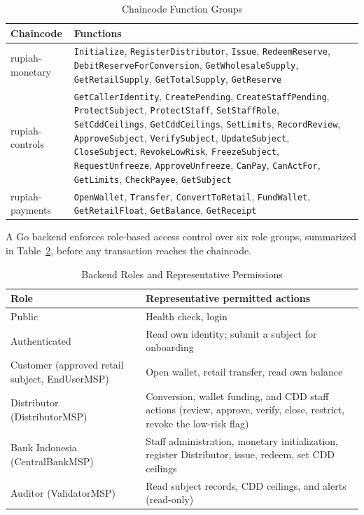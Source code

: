 \documentclass[conference]{IEEEtran}
\begin{document}
\begin{table}[!t]
	\caption{Chaincode Function Groups}
	\label{tab:funcs}
	\centering
	\footnotesize
	\setlength{\tabcolsep}{3.5pt}
	\begin{tabular}{l>{\raggedright\arraybackslash}p{5.9cm}}
		\toprule
		\textbf{Chaincode} & \textbf{Functions} \\
		\midrule
		rupiah-monetary & \texttt{Initialize}, \texttt{RegisterDistributor}, \texttt{Issue}, \texttt{RedeemReserve}, \texttt{DebitReserveForConversion}, \texttt{GetWholesaleSupply}, \texttt{GetRetailSupply}, \texttt{GetTotalSupply}, \texttt{GetReserve} \\
		rupiah-controls & \texttt{GetCallerIdentity}, \texttt{CreatePending}, \texttt{CreateStaffPending}, \texttt{ProtectSubject}, \texttt{ProtectStaff}, \texttt{SetStaffRole}, \texttt{SetCddCeilings}, \texttt{GetCddCeilings}, \texttt{SetLimits}, \texttt{RecordReview}, \texttt{ApproveSubject}, \texttt{VerifySubject}, \texttt{UpdateSubject}, \texttt{CloseSubject}, \texttt{RevokeLowRisk}, \texttt{FreezeSubject}, \texttt{RequestUnfreeze}, \texttt{ApproveUnfreeze}, \texttt{CanPay}, \texttt{CanActFor}, \texttt{GetLimits}, \texttt{CheckPayee}, \texttt{GetSubject} \\
		rupiah-payments & \texttt{OpenWallet}, \texttt{Transfer}, \texttt{ConvertToRetail}, \texttt{FundWallet}, \texttt{GetRetailFloat}, \texttt{GetBalance}, \texttt{GetReceipt} \\
		\bottomrule
	\end{tabular}
\end{table}

A Go backend enforces role-based access control over six role groups, summarized
in Table~\ref{tab:roles}, before any transaction reaches the chaincode.

\begin{table}[!t]
	\caption{Backend Roles and Representative Permissions}
	\label{tab:roles}
	\centering
	\footnotesize
	\setlength{\tabcolsep}{3.5pt}
	\begin{tabular}{>{\raggedright\arraybackslash}p{2.8cm}>{\raggedright\arraybackslash}p{5.4cm}}
		\toprule
		\textbf{Role} & \textbf{Representative permitted actions} \\
		\midrule
		Public          & Health check, login                         \\
		Authenticated   & Read own identity; submit a subject for onboarding \\
		Customer (approved retail subject, EndUserMSP) & Open wallet, retail transfer, read own balance \\
		Distributor (DistributorMSP) & Conversion, wallet funding, and CDD staff actions (review, approve, verify, close, restrict, revoke the low-risk flag) \\
		Bank Indonesia (CentralBankMSP) & Staff administration, monetary initialization, register Distributor, issue, redeem, set CDD ceilings \\
		Auditor (ValidatorMSP) & Read subject records, CDD ceilings, and alerts (read-only) \\
		\bottomrule
	\end{tabular}
\end{table}
\end{document}
